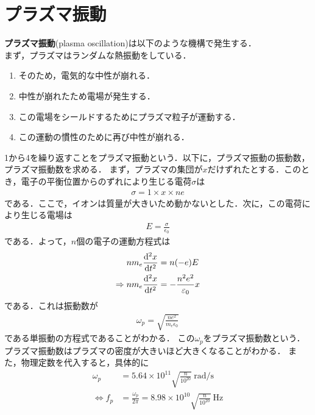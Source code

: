 \documentclass{report}
\begin{document}
  \section{プラズマ振動}
    \textbf{プラズマ振動}(plasma oscillation)は以下のような機構で発生する．\\
    まず，プラズマはランダムな熱振動をしている．
    \begin{enumerate}
      \item そのため，電気的な中性が崩れる．
      \item 中性が崩れたため電場が発生する．
      \item この電場をシールドするためにプラズマ粒子が運動する．
      \item この運動の慣性のために再び中性が崩れる．
    \end{enumerate}
    1から4を繰り返すことをプラズマ振動という．以下に，プラズマ振動の振動数，プラズマ振動数を求める．
    まず，プラズマの集団が$x$だけずれたとする．このとき，電子の平衡位置からのずれにより生じる電荷$\sigma$は
    \begin{align}
      \sigma = 1 \times x \times ne
    \end{align}
    である．ここで，イオンは質量が大きいため動かないとした．次に，この電荷により生じる電場は
    \begin{align}
      E = \frac{\sigma}{\epsilon_0}
    \end{align}
    である．よって，$n$個の電子の運動方程式は
    \begin{align}
      nm_e\dv[2]{x}{t} &= n(-e)E\\
      \Rightarrow nm_e \dv[2]{x}{t} &= -\frac{n^2e^2}{\varepsilon_0}x \label{plasma-oscillation}
    \end{align}
    である．これは振動数が
    \begin{align}
      \omega_p = \sqrt{\frac{ne^2}{m_e\epsilon_0}}
    \end{align}
    である単振動の方程式であることがわかる．
    この$\omega_p$をプラズマ振動数という．
    プラズマ振動数はプラズマの密度が大きいほど大きくなることがわかる．
    また，物理定数を代入すると，具体的に
    \begin{align}
      \omega_p &= 5.64 \times 10^{11} \sqrt{\frac{n}{10^{20}}} \ \text{rad/s} \\ 
      \Leftrightarrow f_p &= \frac{\omega_p}{2\pi} = 8.98 \times 10^{10} \sqrt{\frac{n}{10^{20}}} \ \text{Hz}
    \end{align}
\end{document}
